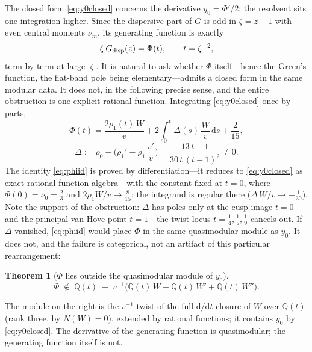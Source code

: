 \documentclass[cntp]{ipart}
\newcommand{\rmd}{\mathrm{d}}
\theoremstyle{plain}
\newtheorem{thm}{Theorem}[section]
\theoremstyle{remark}
\begin{document}
The closed form \eqref{eq:y0closed} concerns the derivative $y_0=\Phi'/2$; the resolvent sits one
integration higher. Since the dispersive part of $G$ is odd in $\zeta=z-1$ with even central moments
$\nu_m$, its generating function is exactly
\begin{equation}
\zeta\,G_{\rm disp}(z)=\Phi(t),\qquad t=\zeta^{-2},
\label{eq:zetaG}
\end{equation}
term by term at large $|\zeta|$. It is natural to ask whether $\Phi$ itself---hence the Green's
function, the flat-band pole being elementary---admits a closed form in the same modular data. It
does not, in the following precise sense, and the entire obstruction is one explicit rational
function. Integrating \eqref{eq:y0closed} once by parts,
\begin{equation}
\Phi(t)=\frac{2\rho_1(t)\,W}{v}+2\!\int_0^{t}\!\Delta(s)\,\frac{W}{v}\,\rmd s+\frac{2}{15},
\label{eq:phiid}
\end{equation}
\begin{equation}
\Delta:=\rho_0-\Big(\rho_1'-\rho_1\,\frac{v'}{v}\Big)
=\frac{13\,t-1}{30\,t\,(t-1)^2}\neq0.
\label{eq:Delta}
\end{equation}
The identity \eqref{eq:phiid} is proved by differentiation---it reduces to \eqref{eq:y0closed} as
exact rational-function algebra---with the constant fixed at $t=0$, where $\Phi(0)=\nu_0=\tfrac23$
and $2\rho_1W/v\to\tfrac8{15}$; the integrand is regular there ($\Delta\,W/v\to-\tfrac1{30}$). Note
the support of the obstruction: $\Delta$ has poles only at the cusp image $t=0$ and the principal
van Hove point $t=1$---the twist locus $t=\tfrac14,\tfrac15,\tfrac19$ cancels out. If $\Delta$
vanished, \eqref{eq:phiid} would place $\Phi$ in the same quasimodular module as $y_0$. It does not,
and the failure is categorical, not an artifact of this particular rearrangement:

\begin{thm}[$\Phi$ lies outside the quasimodular module of $y_0$]\label{thm:phi}
\begin{equation}
\Phi\;\notin\;\mathbb{Q}(t)\;+\;v^{-1}\big(\mathbb{Q}(t)\,W+\mathbb{Q}(t)\,W'+\mathbb{Q}(t)\,W''\big).
\label{eq:phithm}
\end{equation}
\end{thm}

The module on the right is the $v^{-1}$-twist of the full $\rmd/\rmd t$-closure of $W$ over
$\mathbb{Q}(t)$ (rank three, by $\widetilde N(W)=0$), extended by rational functions; it contains
$y_0$ by \eqref{eq:y0closed}. The derivative of the generating function is quasimodular; the
generating function itself is not.
\end{document}
